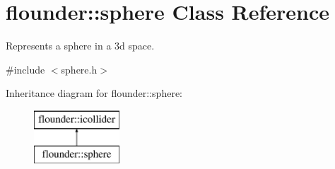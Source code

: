 \hypertarget{classflounder_1_1sphere}{}\section{flounder\+:\+:sphere Class Reference}
\label{classflounder_1_1sphere}


Represents a sphere in a 3d space.  




{\ttfamily \#include $<$sphere.\+h$>$}

Inheritance diagram for flounder\+:\+:sphere\+:\begin{figure}[H]
\begin{center}
\leavevmode
\includegraphics[height=2.000000cm]{classflounder_1_1sphere}
\end{center}
\end{figure}
